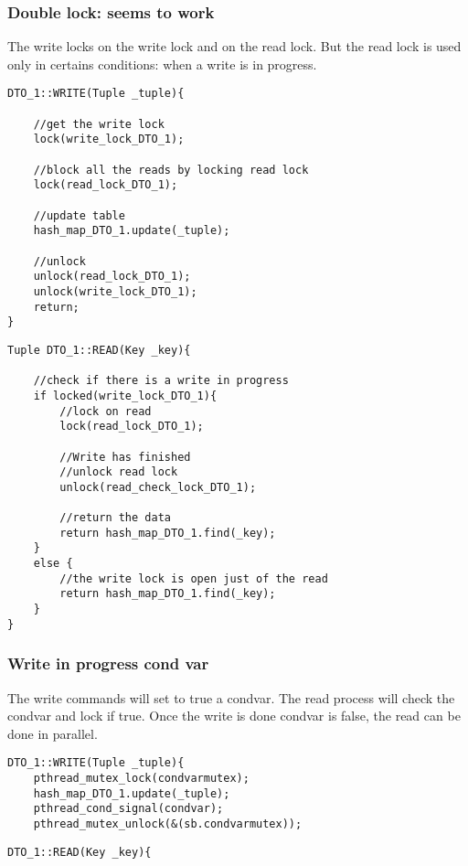 \documentclass[a4paper]{article}
\begin{document}
\subsubsection{Double lock: seems to work}
The write locks on the write lock and on the read lock. But the read lock is
used only in certains conditions: when a write is in progress.

\begin{verbatim}
DTO_1::WRITE(Tuple _tuple){

    //get the write lock
    lock(write_lock_DTO_1);
    
    //block all the reads by locking read lock
    lock(read_lock_DTO_1);
    
    //update table
    hash_map_DTO_1.update(_tuple);
    
    //unlock 
    unlock(read_lock_DTO_1);
    unlock(write_lock_DTO_1); 
    return;
}
\end{verbatim}



\begin{verbatim}
Tuple DTO_1::READ(Key _key){

    //check if there is a write in progress
    if locked(write_lock_DTO_1){
        //lock on read
        lock(read_lock_DTO_1);     
        
        //Write has finished   
        //unlock read lock
        unlock(read_check_lock_DTO_1);
       
        //return the data
        return hash_map_DTO_1.find(_key);
    }
    else {
        //the write lock is open just of the read
        return hash_map_DTO_1.find(_key);
    }
}
\end{verbatim}


\subsubsection{Write in progress cond var}
The write commands will set to true a condvar. The read process will check the
condvar and lock if true.
Once the write is done condvar is false, the read can be done in parallel.

\begin{verbatim}
DTO_1::WRITE(Tuple _tuple){
    pthread_mutex_lock(condvarmutex);
    hash_map_DTO_1.update(_tuple);
    pthread_cond_signal(condvar);
    pthread_mutex_unlock(&(sb.condvarmutex));
\end{verbatim}

\begin{verbatim}
DTO_1::READ(Key _key){

\end{verbatim}
\end{document}
